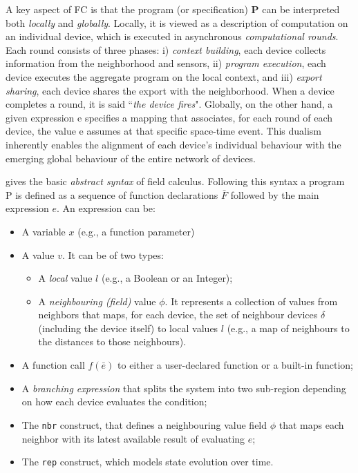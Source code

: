 \documentclass[12pt,a4paper,openright,twoside]{book}
\begin{document}
A key aspect of FC is that the program (or specification) \textbf{P} can be interpreted both 
    \emph{locally} and \emph{globally}. Locally, it is viewed as a description of computation on 
    an individual device, which is executed in asynchronous \emph{computational rounds}. 
    Each round consists of three phases:
    i) \emph{context building}, each device collects information from the 
         neighborhood and sensors,
    ii) \emph{program execution}, each device executes the aggregate program on the local context, and
    iii) \emph{export sharing}, each device shares the export with the neighborhood.
    When a device completes a round, it is said ``\emph{the device fires}".
    Globally, on the other hand, a given expression \textsf{e} specifies a mapping that associates, 
    for each round of each device, the value \textsf{e} assumes at that specific space-time event.
    This dualism inherently enables the alignment of each device's individual behaviour with the 
    emerging global behaviour of the entire network of devices.

 gives the basic \emph{abstract syntax} of field calculus. Following this syntax 
    a program P is defined as a sequence of function declarations $\bar{F}$ followed by the main 
    expression $e$. An expression can be: 
    \begin{itemize}
        \item A variable $x$ (e.g., a function parameter)
        \item A value $v$. It can be of two types:
        \begin{itemize}
            \item A \emph{local} value $l$ (e.g., a Boolean or an Integer);
            \item A \emph{neighbouring (field)} value $\phi$. It represents a collection of values 
                from neighbors that maps, for each device, the set of neighbour devices $\delta$
                (including the device itself) to local values $l$ (e.g., a map of neighbours to the distances 
                to those neighbours).
        \end{itemize}
        \item A function call $f(\bar{e})$ to either a user-declared function or a built-in function;
        \item A \emph{branching expression} that splits the system into two sub-region depending on 
            how each device evaluates the condition;
        \item The \texttt{nbr} construct, that defines a neighbouring value field $\phi$ that maps 
            each neighbor with its latest available result of evaluating $e$;
        \item The \texttt{rep} construct, which models state evolution over time.
    \end{itemize}
\end{document}
